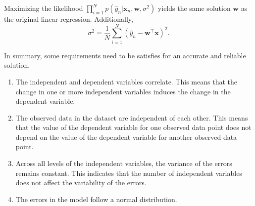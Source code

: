 Maximizing the likelihood $\prod\limits_{i=1}^N p(\hat{y}_n | \mathbf{x}_n, \mathbf{w}, \sigma^2)$ yields the same solution $\mathbf{w}$ as the original linear regression. Additionally,
\begin{equation}
 \sigma^2 = \dfrac{1}{N}\sum\limits_{i=1}^N(\hat{y}_n - \mathbf{w}^\top\mathbf{x})^2.
\end{equation}

In summary, some requirements need to be satisfies for an accurate and reliable solution.

\begin{enumerate}
 \item  The independent and dependent variables correlate. This means that the change in one or more independent variables induces the change in the dependent variable.
 \item The observed data in the dataset are independent of each other. This means that the value of the dependent variable for one observed data point does not depend on the value of the dependent variable for another observed data point.
 \item Across all levels of the independent variables, the variance of the errors remains constant. This indicates that the number of independent variables does not affect the variability of the errors.
 \item The errors in the model follow a normal distribution.
\end{enumerate}



